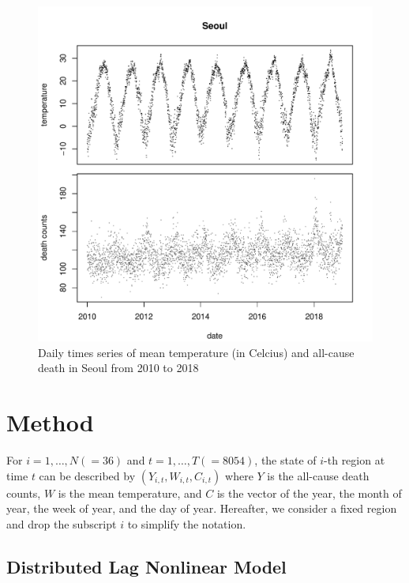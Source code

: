 \documentclass[12pt]{article}
\begin{document}
\begin{figure}
	\includegraphics[width = \textwidth]{figures/temporal-trend.pdf}
	\caption{
		Daily times series of 
		mean temperature (in Celcius) and all-cause death in Seoul from 2010 to 2018}
	\label{figure:temporal-trend}
\end{figure}


\section{Method} 
\label{section:method}

For $i = 1, \dots, N(=36)$ and $t = 1, \dots, T(=8054)$, 
the state of $i$-th region at time $t$ can be described by $(Y_{i,t}, W_{i,t}, C_{i,t})$ 
where $Y$ is the all-cause death counts, $W$ is the mean temperature, 
and $C$ is the vector of the year, the month of year, the week of year, and the day of year.
Hereafter, we consider a fixed region and drop the subscript $i$ to simplify the notation.

\subsection{Distributed Lag Nonlinear Model}
\label{section:dlnm}
\end{document}
